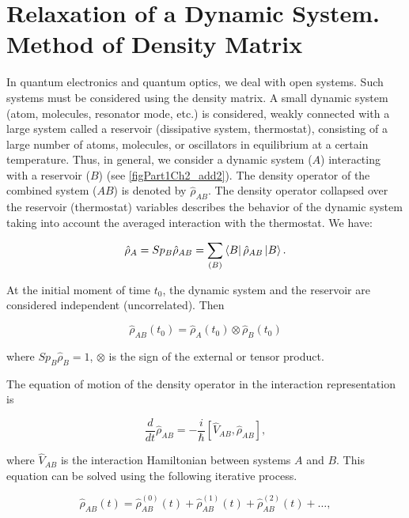 \section{Relaxation of a Dynamic System. Method of Density Matrix}

In quantum electronics and quantum optics, we deal with open systems. Such systems must be considered using the density matrix. A small dynamic system (atom, molecules, resonator mode, etc.) is considered, weakly connected with a large system called a reservoir (dissipative system, thermostat), consisting of a large number of atoms, molecules, or oscillators in equilibrium at a certain temperature. Thus, in general, we consider a dynamic system ($A$) interacting with a reservoir ($B$) (see \autoref{figPart1Ch2_add2}). The density operator of the combined system ($AB$) is denoted by $\hat{\rho}_{AB}$. The density operator collapsed over the reservoir (thermostat) variables describes the behavior of the dynamic system taking into account the averaged interaction with the thermostat. We have:

\begin{equation}
\hat{\rho}_{A} = Sp_{B} \hat{\rho}_{AB} = 
\sum_{\left(B\right)}
\bra{B}\hat{\rho}_{AB}\ket{B}.
\end{equation}

At the initial moment of time $t_0$, the dynamic system and the reservoir are considered independent (uncorrelated). Then

\begin{equation}
\hat{\rho}_{AB}\left(t_0\right) = 
\hat{\rho}_{A}\left(t_0\right)
\otimes
\hat{\rho}_{B}\left(t_0\right)
\end{equation}

where $Sp_B \hat{\rho}_{B} = 1$, $\otimes$ is the sign of the external or tensor product. 



The equation of motion of the density operator in the interaction representation is

\[
\frac{d}{d t}\hat{\rho}_{AB} = 
- \frac{i}{\hbar}\left[\hat{V}_{AB}, \hat{\rho}_{AB}\right],
\]

where $\hat{V}_{AB}$ is the interaction Hamiltonian between systems $A$ and $B$. This equation can be solved using the following iterative process.

\begin{equation}
\hat{\rho}_{AB}\left(t\right) = 
\hat{\rho}^{(0)}_{AB}\left(t\right) +
\hat{\rho}^{(1)}_{AB}\left(t\right) +
\hat{\rho}^{(2)}_{AB}\left(t\right) + \dots,
\label{eqCh2_rho_iter}
\end{equation}

